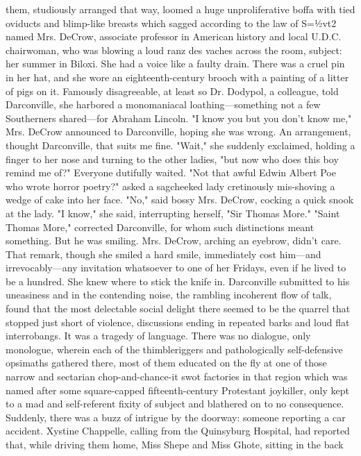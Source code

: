 them, studiously arranged that way, loomed a huge unproliferative boffa with
tied oviducts and blimp-like breasts which sagged according to the law of S=½vt2
named Mrs. DeCrow, associate professor in American history and local U.D.C.
chairwoman, who was blowing a loud ranz des vaches across the room, subject: her
summer in Biloxi. She had a voice like a faulty drain. There was a cruel pin in
her hat, and she wore an eighteenth-century brooch with a painting of a litter
of pigs on it. Famously disagreeable, at least so Dr. Dodypol, a colleague, told
Darconville, she harbored a monomaniacal loathing---something not a few
Southerners shared---for Abraham Lincoln.
  "I know you but you don't know me," Mrs. DeCrow announced to Darconville,
hoping she was wrong.
  An arrangement, thought Darconville, that suits me fine.
  "Wait," she suddenly exclaimed, holding a finger to her nose and turning to
the other ladies, "but now who does this boy remind me of?"
  Everyone dutifully waited.
  "Not that awful Edwin Albert Poe who wrote horror poetry?" asked a sagcheeked
lady cretinously mis-shoving a wedge of cake into her face.
  "No," said bossy Mrs. DeCrow, cocking a quick snook at the lady. "I know," she
said, interrupting herself, "Sir Thomas More."
  "Saint Thomas More," corrected Darconville, for whom such distinctions meant
something. But he was smiling.
  Mrs. DeCrow, arching an eyebrow, didn't care. That remark, though she smiled a
hard smile, immediately cost him---and irrevocably---any invitation whatsoever to
one of her Fridays, even if he lived to be a hundred. She knew where to stick
the knife in.
  Darconville submitted to his uneasiness and in the contending noise, the
rambling incoherent flow of talk, found that the most delectable social delight
there seemed to be the quarrel that stopped just short of violence, discussions
ending in repeated barks and loud flat interrobangs. It was a tragedy of
language. There was no dialogue, only monologue, wherein each of the
thimbleriggers and pathologically self-defensive opsimaths gathered there, most
of them educated on the fly at one of those narrow and sectarian
chop-and-chance-it swot factories in that region which was named after some
square-capped fifteenth-century Protestant joykiller, only kept to a mad and
self-referent fixity of subject and blathered on to no consequence.
  Suddenly, there was a buzz of intrigue by the doorway: someone reporting a car
accident. Xystine Chappelle, calling from the Quinsyburg Hospital, had reported
that, while driving them home, Miss Shepe and Miss Ghote, sitting in the back
